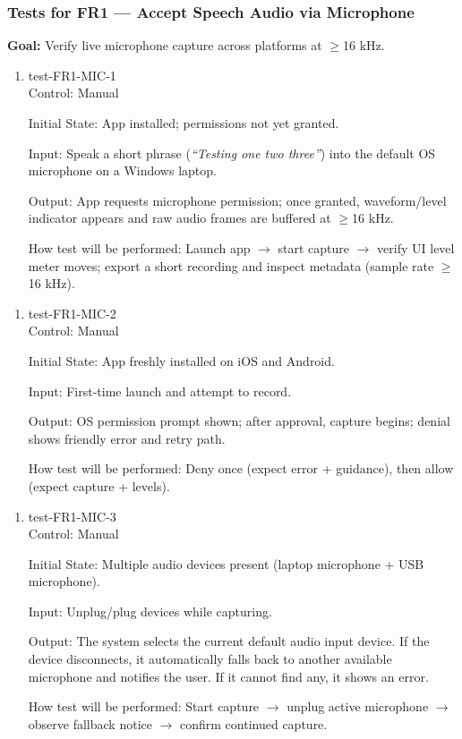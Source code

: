 \documentclass[12pt, titlepage]{article}
\begin{document}
\subsubsection{Tests for FR1 — Accept Speech Audio via Microphone}

\textbf{Goal:} Verify live microphone capture across platforms at $\geq$16 kHz.

\begin{enumerate}

\item{test-FR1-MIC-1\\}
Control: Manual

Initial State: App installed; permissions not yet granted.

Input: Speak a short phrase (\textit{``Testing one two three''}) into the default OS microphone on a Windows laptop.

Output: App requests microphone permission; once granted, waveform/level indicator appears and raw audio frames are buffered at $\geq$16 kHz.

How test will be performed: Launch app $\rightarrow$ start capture $\rightarrow$ verify UI level meter moves; export a short recording and inspect metadata (sample rate $\geq$16 kHz).
\end{enumerate}

\begin{enumerate}
\item{test-FR1-MIC-2\\}
Control: Manual

Initial State: App freshly installed on iOS and Android.

Input: First-time launch and attempt to record.

Output: OS permission prompt shown; after approval, capture begins; denial shows friendly error and retry path.

How test will be performed: Deny once (expect error + guidance), then allow (expect capture + levels).
\end{enumerate}

\begin{enumerate}
\item{test-FR1-MIC-3\\}
Control: Manual

Initial State: Multiple audio devices present (laptop microphone + USB microphone).

Input: Unplug/plug devices while capturing.

Output: The system selects the current default audio input device. If the device disconnects, it automatically falls back to another available microphone and notifies the user. If it cannot find any, it shows an error.

How test will be performed: Start capture $\rightarrow$ unplug active microphone $\rightarrow$ observe fallback notice $\rightarrow$ confirm continued capture.
\end{enumerate}
\end{document}
